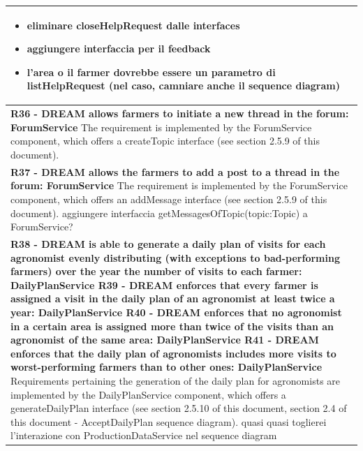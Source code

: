 \documentclass{article}
\begin{document}
\begin{longtable}[c]{|m{11.75cm}|}
    \color{red}
    \begin{itemize}
        \item eliminare closeHelpRequest dalle interfaces
        \item aggiungere interfaccia per il feedback
        \item l'area o il farmer dovrebbe essere un parametro di listHelpRequest (nel caso, camniare anche il sequence diagram)
    \end{itemize}
    \color{black}\\
    \hline
    
    \textbf{R36 - DREAM allows farmers to initiate a new thread in the forum: ForumService}
    \newline\newline
    The requirement is implemented by the ForumService component, which offers a createTopic interface (see section 2.5.9 of this document).\\
    \hline
    
    \textbf{R37 - DREAM allows the farmers to add a post to a thread in the forum: ForumService}
    \newline\newline
    The requirement is implemented by the ForumService component, which offers an addMessage interface (see section 2.5.9 of this document).
    \color{red}
    aggiungere interfaccia getMessagesOfTopic(topic:Topic) a ForumService?
    \color{black}\\
    \hline
    
    \textbf{R38 - DREAM is able to generate a daily plan of visits for each agronomist evenly distributing (with exceptions to bad-performing farmers) over the year the number of visits to each farmer: DailyPlanService
    \newline\newline
    R39 - DREAM enforces that every farmer is assigned a visit in the daily plan of an agronomist at least twice a year: DailyPlanService
    \newline\newline
    R40 - DREAM enforces that no agronomist in a certain area is assigned more than twice of the visits than an agronomist of the same area: DailyPlanService
    \newline\newline
    R41 - DREAM enforces that the daily plan of agronomists includes more visits to worst-performing farmers than to other ones: DailyPlanService}
    \newline\newline
    Requirements pertaining the generation of the daily plan for agronomists are implemented by the DailyPlanService component, which offers a generateDailyPlan interface (see section 2.5.10 of this document, section 2.4 of this document - AcceptDailyPlan sequence diagram). 
    \color{red}
    quasi quasi toglierei l'interazione con ProductionDataService nel sequence diagram
    \color{black}\\
    \hline
    

\end{longtable}
\end{document}
